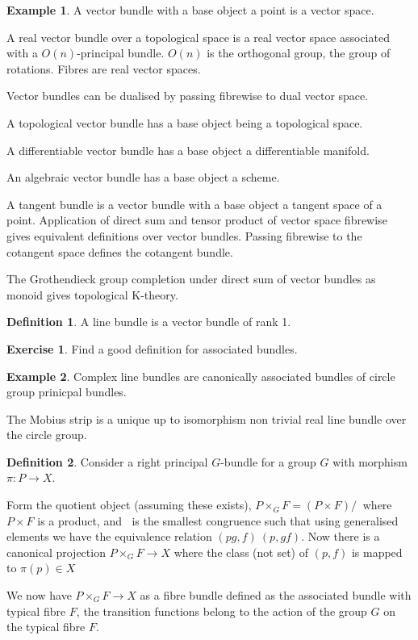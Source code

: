\documentclass[10pt]{article}
\theoremstyle{plain}%
\theoremstyle{definition}
\newtheorem{definition}{Definition}[section]
\newtheorem{example}{Example}[section]
\newtheorem{exercise}{Exercise}[section]
\theoremstyle{remark}
\begin{document}
\begin{example}
	A vector bundle with a base object a point is a vector space.

	A real vector bundle over a topological space is a real vector space associated with a $O(n)$-principal bundle. $O(n)$ is the orthogonal group, the group of rotations. Fibres are real vector spaces.

	Vector bundles can be dualised by passing fibrewise to dual vector space.

	A topological vector bundle has a base object being a topological space.

	A differentiable vector bundle has a base object a differentiable manifold.

	An algebraic vector bundle has a base object a scheme.

	A tangent bundle is a vector bundle with a base object a tangent space of a point.
	Application of direct sum and tensor product of vector space fibrewise gives equivalent definitions over vector bundles. Passing fibrewise to the cotangent space defines the cotangent bundle.
	
	The Grothendieck group completion under direct sum of vector bundles as monoid gives topological K-theory.
\end{example}

\begin{definition}
	A line bundle is a vector bundle of rank 1.
\end{definition}

\begin{exercise}
	Find a good definition for associated bundles.
\end{exercise}

\begin{example}
	Complex line bundles are canonically associated bundles of circle group prinicpal bundles.

	The Mobius strip is a unique up to isomorphism non trivial real line bundle over the circle group.
\end{example}

\begin{definition}
	Consider a right principal $G$-bundle for a group $G$ with morphism $\pi : P \rightarrow X$.

	Form the quotient object (assuming these exists), $P \times_G F = (P \times F) / ~$ where $P \times F$ is a product, and $~$ is the smallest congruence such that using generalised elements we have the equivalence relation $(pg, f) ~ (p, gf)$. Now there is a canonical projection $P \times_G F \rightarrow X$ where the class (not set) of $(p, f)$ is mapped to $\pi(p) \in X$

	We now have $P \times_G F \rightarrow X$ as a fibre bundle defined as the associated bundle with typical fibre $F$, the transition functions belong to the action of the group $G$ on the typical fibre $F$.
\end{definition}
\end{document}
